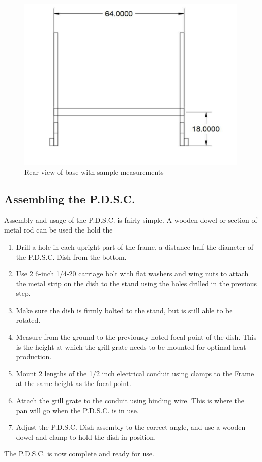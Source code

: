 \documentclass[titlepage]{article}
\begin{document}
\begin{figure}[!htb]
                  \includegraphics[width=\linewidth]{base_rear}
                  \caption{Rear view of base with sample measurements}\label{fig:awesome_image3}
                \endminipage
                
                \end{figure}
        \subsection{Assembling the P.D.S.C.}
            Assembly and usage of the P.D.S.C. is fairly simple. A wooden dowel or section of metal rod can be used the hold the 
            \begin{enumerate}
                \item Drill a hole in each upright part of the frame, a distance half the diameter of the P.D.S.C. Dish from the bottom.
                \item Use 2 6-inch 1/4-20 carriage bolt with flat washers and wing nuts to attach the metal strip on the dish to the stand using the holes drilled in the previous step.
                \item Make sure the dish is firmly bolted to the stand, but is still able to be rotated.
                \item Measure from the ground to the previously noted focal point of the dish.  This is the height at which the grill grate needs to be mounted for optimal heat production.
                \item Mount 2 lengths of the 1/2 inch electrical conduit using clamps to the Frame at the same height as the focal point.
                \item Attach the grill grate to the conduit using binding wire.  This is where the pan will go when the P.D.S.C. is in use.
                \item Adjust the P.D.S.C. Dish assembly to the correct angle, and use a wooden dowel and clamp to hold the dish in position.
            \end{enumerate}
            The P.D.S.C. is now complete and ready for use.
    \newpage
\end{document}
